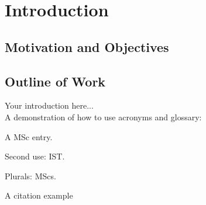 
\chapter{Introduction}
\label{chapter:introduction}

\section{Motivation and Objectives}
\section{Outline of Work}


Your introduction here...\\

A demonstration of how to use acronyms and glossary:

A \gls{MSc} entry.

Second use: \gls{IST}.

Plurals: \glspl{MSc}.

A citation example \cite{nobody}